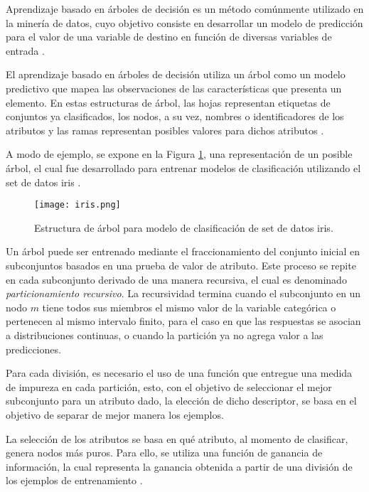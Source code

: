 Aprendizaje basado en árboles de decisión es un método comúnmente utilizado en la minería de datos, cuyo objetivo consiste en desarrollar un modelo de predicción para el valor de una variable de destino en función de diversas variables de entrada \cite{freund1999alternating}.

El aprendizaje basado en árboles de decisión utiliza un árbol como un modelo predictivo que mapea las observaciones de las características que presenta un elemento. En estas estructuras de árbol, las hojas representan etiquetas de conjuntos ya clasificados, los nodos, a su vez, nombres o identificadores de los atributos y las ramas representan posibles valores para dichos atributos \cite{bhargava2013decision}.

A modo de ejemplo, se expone en la Figura \ref{arboles}, una representación de un posible árbol, el cual fue desarrollado para entrenar modelos de clasificación utilizando el set de datos iris \cite{fisher1936use}.

\begin{figure}[!h]
	
	\centering
	\texttt{[image: iris.png]}
	\caption{Estructura de árbol para modelo de clasificación de set de datos iris.}
	\label{arboles}
\end{figure}


Un árbol puede ser entrenado mediante el fraccionamiento del conjunto inicial en subconjuntos basados en una prueba de valor de atributo. Este proceso se repite en cada subconjunto derivado de una manera recursiva, el cual es denominado \textit{particionamiento recursivo}. La recursividad termina cuando el subconjunto en un nodo $m$ tiene todos sus miembros el mismo valor de la variable categórica o pertenecen al mismo intervalo finito, para el caso en que las respuestas se asocian a distribuciones continuas, o cuando la partición ya no agrega valor a las predicciones.

Para cada división, es necesario el uso de una función que entregue una medida de impureza en cada partición, esto, con el objetivo de seleccionar el mejor subconjunto para un atributo dado, la elección de dicho descriptor, se basa en el objetivo de separar de mejor manera los ejemplos. 

La selección de los atributos se basa en qué atributo, al momento de clasificar, genera nodos más puros. Para ello, se utiliza una función de ganancia de información, la cual representa la ganancia  obtenida a partir de una división de los ejemplos de entrenamiento \cite{breiman2017classification}. 


